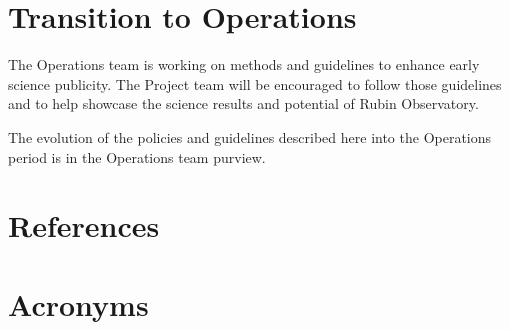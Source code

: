 \documentclass[SE,authoryear,toc,lsstdraft]{lsstdoc}
\begin{document}
\section{Transition to Operations}
\label{operations}

The Operations team is working on methods and guidelines to enhance early science publicity.
The Project team will be encouraged to follow those guidelines and to help showcase the science results and potential of Rubin Observatory.

The evolution of the policies and guidelines described here into the Operations period is in the Operations team purview.


\appendix
\section{References} \label{sec:bib}
\renewcommand{\refname}{} %


\section{Acronyms} \label{sec:acronyms}

\end{document}
